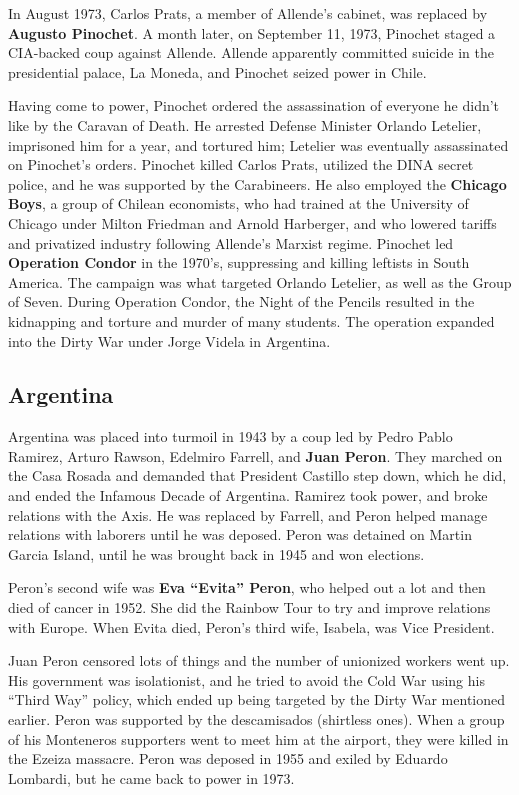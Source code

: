 In August 1973, Carlos Prats, a member of Allende's cabinet, was replaced by \textbf{Augusto Pinochet}.
A month later, on September 11, 1973, Pinochet staged a CIA-backed coup against Allende.
Allende apparently committed suicide in the presidential palace, La Moneda,
and Pinochet seized power in Chile.

Having come to power, Pinochet ordered the assassination of everyone he didn't like by the Caravan of Death.
He arrested Defense Minister Orlando Letelier, imprisoned him for a year, and tortured him;
Letelier was eventually assassinated on Pinochet's orders.
Pinochet killed Carlos Prats, utilized the DINA secret police, and he was supported by the Carabineers.
He also employed the \textbf{Chicago Boys}, a group of Chilean economists,
who had trained at the University of Chicago under Milton Friedman and Arnold Harberger,
and who lowered tariffs and privatized industry following Allende's Marxist regime.
Pinochet led \textbf{Operation Condor} in the 1970's, suppressing and killing leftists in South America.
The campaign was what targeted Orlando Letelier, as well as the Group of Seven.
During Operation Condor, the Night of the Pencils resulted in the kidnapping and torture and murder of many students.
The operation expanded into the Dirty War under Jorge Videla in Argentina.

\subsection*{Argentina}

Argentina was placed into turmoil in 1943 by a coup led by Pedro Pablo Ramirez, Arturo Rawson, Edelmiro Farrell,
and \textbf{Juan Peron}.
They marched on the Casa Rosada and demanded that President Castillo step down,
which he did, and ended the Infamous Decade of Argentina.
Ramirez took power, and broke relations with the Axis.
He was replaced by Farrell, and Peron helped manage relations with laborers until he was deposed.
Peron was detained on Martin Garcia Island, until he was brought back in 1945 and won elections.

Peron's second wife was \textbf{Eva ``Evita'' Peron}, who helped out a lot and then died of cancer in 1952.
She did the Rainbow Tour to try and improve relations with Europe.
When Evita died, Peron's third wife, Isabela, was Vice President.

Juan Peron censored lots of things and the number of unionized workers went up.
His government was isolationist, and he tried to avoid the Cold War using his ``Third Way'' policy,
which ended up being targeted by the Dirty War mentioned earlier.
Peron was supported by the descamisados (shirtless ones).
When a group of his Monteneros supporters went to meet him at the airport,
they were killed in the Ezeiza massacre.
Peron was deposed in 1955 and exiled by Eduardo Lombardi, but he came back to power in 1973.

